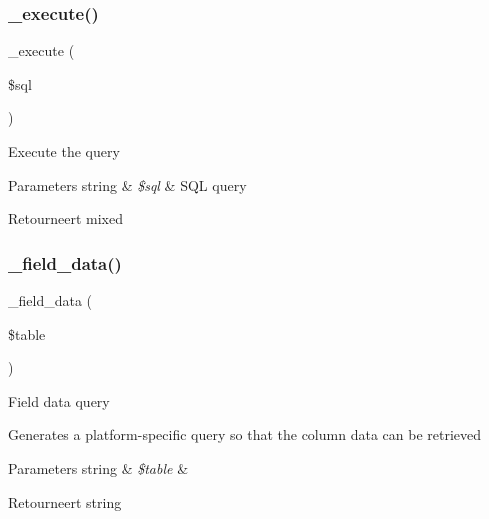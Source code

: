 \subsubsection{\texorpdfstring{\_execute()}{\_execute()}}
{\footnotesize\ttfamily \+\_\+execute (\begin{DoxyParamCaption}\item[{}]{\$sql }\end{DoxyParamCaption})\hspace{0.3cm}{\ttfamily [protected]}}

Execute the query


\begin{DoxyParams}[1]{Parameters}
string & {\em \$sql} & S\+QL query \\
\hline
\end{DoxyParams}
\begin{DoxyReturn}{Retourneert}
mixed 
\end{DoxyReturn}
\mbox{\label{class_c_i___d_b__pdo__driver_a95247d9671893adc3444cb184ad32ea1}} 
\subsubsection{\texorpdfstring{\_field\_data()}{\_field\_data()}}
{\footnotesize\ttfamily \+\_\+field\+\_\+data (\begin{DoxyParamCaption}\item[{}]{\$table }\end{DoxyParamCaption})\hspace{0.3cm}{\ttfamily [protected]}}

Field data query

Generates a platform-\/specific query so that the column data can be retrieved


\begin{DoxyParams}[1]{Parameters}
string & {\em \$table} & \\
\hline
\end{DoxyParams}
\begin{DoxyReturn}{Retourneert}
string 
\end{DoxyReturn}
\mbox{\label{class_c_i___d_b__pdo__driver_ac81ac882c1d54347d810199a15856aac}} 
